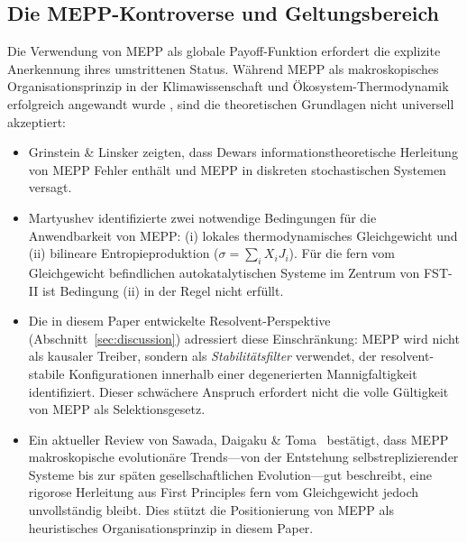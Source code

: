 \documentclass[12pt,a4paper]{article}
\theoremstyle{remark}
\begin{document}
\subsection{Die MEPP-Kontroverse und Geltungsbereich}

Die Verwendung von MEPP als globale Payoff-Funktion erfordert die explizite Anerkennung ihres umstrittenen Status. W\"ahrend MEPP als makroskopisches Organisationsprinzip in der Klimawissenschaft und \"Okosystem-Thermodynamik erfolgreich angewandt wurde \citep{MEPP2006}, sind die theoretischen Grundlagen nicht universell akzeptiert:

\begin{itemize}
\item Grinstein \& Linsker \citep{GrinsteinLinsker2007} zeigten, dass Dewars informationstheoretische Herleitung von MEPP Fehler enth\"alt und MEPP in diskreten stochastischen Systemen versagt.
\item Martyushev \citep{Martyushev2010} identifizierte zwei notwendige Bedingungen f\"ur die Anwendbarkeit von MEPP: (i) lokales thermodynamisches Gleichgewicht und (ii) bilineare Entropieproduktion ($\sigma = \sum_i X_i J_i$). F\"ur die fern vom Gleichgewicht befindlichen autokatalytischen Systeme im Zentrum von FST-II ist Bedingung (ii) in der Regel nicht erf\"ullt.
\item Die in diesem Paper entwickelte Resolvent-Perspektive (Abschnitt~\ref{sec:discussion}) adressiert diese Einschr\"ankung: MEPP wird nicht als kausaler Treiber, sondern als \emph{Stabilit\"atsfilter} verwendet, der resolvent-stabile Konfigurationen innerhalb einer degenerierten Mannigfaltigkeit identifiziert. Dieser schw\"achere Anspruch erfordert nicht die volle G\"ultigkeit von MEPP als Selektionsgesetz.
\item Ein aktueller Review von Sawada, Daigaku \& Toma~\citep{Toma2025} best\"atigt, dass MEPP makroskopische evolution\"are Trends---von der Entstehung selbstreplizierender Systeme bis zur sp\"aten gesellschaftlichen Evolution---gut beschreibt, eine rigorose Herleitung aus First Principles fern vom Gleichgewicht jedoch unvollst\"andig bleibt. Dies st\"utzt die Positionierung von MEPP als heuristisches Organisationsprinzip in diesem Paper.
\end{itemize}
\end{document}
